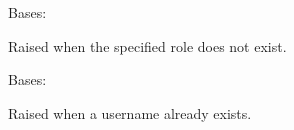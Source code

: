 \documentclass[a4paper,11pt,spanish]{sphinxmanual}
\begin{document}
\begin{fulllineitems}
\label{\detokenize{api/users/users.services:users.services.RoleNotFound}}
\pysigstartsignatures
\pysigline
{}
\pysigstopsignatures
\sphinxAtStartPar
Bases: 

\sphinxAtStartPar
Raised when the specified role does not exist.

\end{fulllineitems}


\begin{fulllineitems}
\label{\detokenize{api/users/users.services:users.services.UsernameTaken}}
\pysigstartsignatures
\pysigline
{}
\pysigstopsignatures
\sphinxAtStartPar
Bases: 

\sphinxAtStartPar
Raised when a username already exists.

\end{fulllineitems}

\end{document}
